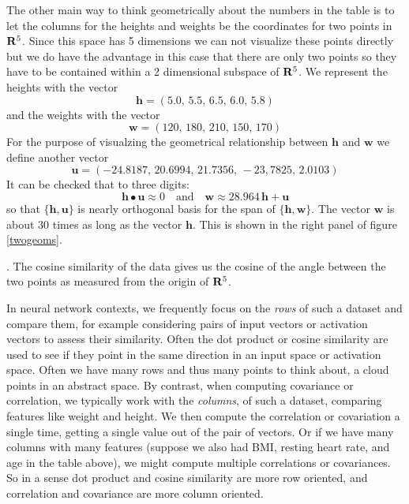    The other main way to think geometrically about the numbers in the table is 
to let the columns for the heights and weights be the coordinates for two 
points in ${\bf R}^5$.  Since this space has 5 dimensions we can not visualize 
these points directly but we do have the advantage in this case that there are 
only two points so they have to be contained within a 2 dimensional subspace
of ${\bf R}^5$.  We represent the heights with the vector 
\begin{equation*}
\mathbf{h} = (5.0,\, 5.5,\, 6.5,\, 6.0,\, 5.8)
\end{equation*}
and the weights with the vector 
\begin{equation*}
\mathbf{w} = (120,\, 180,\, 210,\, 150,\, 170)
\end{equation*}
For the purpose of visualzing the geometrical relationship between 
$\mathbf{h}$ and $\mathbf{w}$ we define another vector
\begin{equation*}
\mathbf{u} = (-24.8187,\, 20.6994,\, 21.7356,\, -23,7825,\, 2.0103)
\end{equation*}
It can be checked that to three digits:
\begin{equation*}
\mathbf{h} \bullet \mathbf{u} \approx 0 \quad \mbox{and} \quad
\mathbf{w} \approx 28.964 \, \mathbf{h} + \mathbf{u}
\end{equation*}
so that $\{ \mathbf{h}, \mathbf{u} \}$ is nearly orthogonal basis for the span
of $\{ \mathbf{h}, \mathbf{w} \}$.  The vector $\mathbf{w}$ is about $30$ 
times as long as the vector $\mathbf{h}$.  This is shown in the right panel of
figure \ref{twogeoms}.


.  The cosine 
similarity of the data gives us the cosine of the angle between the two points 
as measured from the origin of ${\bf R}^5$.

In neural network contexts, we frequently focus on the \emph{rows} of such a 
dataset and compare them, for example considering pairs of input vectors or 
activation vectors to assess their similarity.  Often the dot product or cosine 
similarity are used to see if they point in the same direction in an input 
space or activation space.  Often we have many rows and thus many points to 
think about, a cloud points in an abstract space.  By contrast, when computing 
covariance or correlation, we typically work with the \emph{columns}, of such a 
dataset, comparing features like weight and height. We then compute the 
correlation or covariation a single time, getting a single value out of the 
pair of vectors.  Or if we have many columns with many features (suppose we 
also had BMI, resting heart rate, and age in the table above), we might compute 
multiple correlations or covariances.  So in a sense dot product and cosine 
similarity are more row oriented, and correlation and covariance are more 
column oriented.

